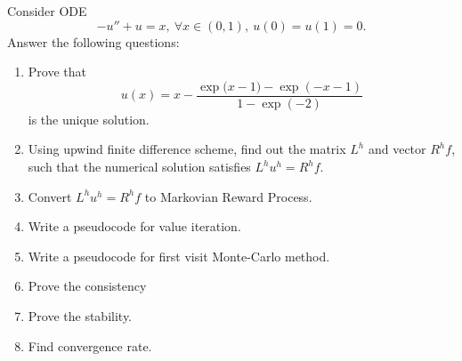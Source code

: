 \documentclass{article}
\begin{document}
Consider ODE
$$ -  u'' + u = x, \ \forall x\in (0,1), \ u(0) = u(1) = 0.$$
Answer the following questions:
\begin{enumerate}
 \item Prove that 
 $$u(x) = x - \frac{\exp{(x-1}) -  \exp{(- x -1)}}{ 1 - \exp(-2)}$$
 is the unique solution.
 \item Using upwind finite difference scheme, find out the matrix $L^{h}$ and vector $R^{h} f$, such that the numerical solution satisfies $L^{h} u^{h} = R^{h} f$.
\item Convert $L^{h} u^{h} = R^{h} f$ to Markovian Reward Process.
\item Write a pseudocode for value iteration.
\item Write a pseudocode for first visit Monte-Carlo method.
 \item Prove the consistency
 \item Prove the stability.
 \item Find convergence rate.
\end{enumerate}
\end{document}
